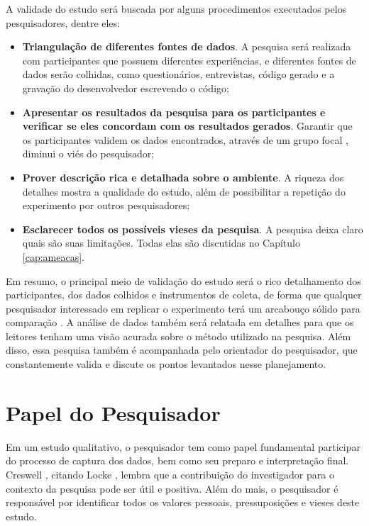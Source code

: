 A validade do estudo será buscada por alguns procedimentos executados pelos
pesquisadores, dentre eles:

\begin{itemize}
	\item \textbf{Triangulação de diferentes fontes de dados}. A pesquisa será
	realizada com participantes que possuem diferentes experiências, e diferentes
	fontes de dados serão colhidas, como questionários, entrevistas, código gerado e 
	a gravação do desenvolvedor escrevendo o código;

	\item \textbf{Apresentar os resultados da pesquisa para os participantes e
	verificar se eles concordam com os resultados gerados}. Garantir que os
	participantes validem os dados encontrados, através de um grupo focal \cite{creswell},
	diminui o viés do pesquisador;

	\item \textbf{Prover descrição rica e detalhada sobre o ambiente}. A riqueza
	dos detalhes mostra a qualidade do estudo, além de possibilitar a repetição do
	experimento por outros pesquisadores;

	\item \textbf{Esclarecer todos os possíveis vieses da pesquisa}. A pesquisa
	deixa claro quais são suas limitações. Todas elas são discutidas no Capítulo
	\ref{cap:ameacas}.

\end{itemize}

Em resumo, o principal meio de validação do estudo será o rico detalhamento dos
participantes, dos dados colhidos e instrumentos de coleta, de forma
que qualquer pesquisador interessado em replicar o experimento terá um
arcabouço sólido para comparação \cite{merriam-1998}. A análise de
dados também será relatada em detalhes para que os leitores tenham uma visão
acurada sobre o método utilizado na pesquisa. 
Além disso, essa pesquisa também é acompanhada pelo orientador do pesquisador,
que constantemente valida e discute os pontos levantados nesse planejamento.

\section{Papel do Pesquisador}
\label{sec:planejamento-papel}

Em um estudo qualitativo, o pesquisador tem como papel fundamental participar do 
processo de captura dos dados, bem como seu preparo e interpretação final.
Creswell \cite{creswell}, citando Locke \cite{locke}, lembra
que a contribuição do investigador para o contexto da pesquisa pode ser útil e
positiva. Além do mais, o pesquisador é responsável por
identificar todos os valores pessoais, pressuposições e vieses deste estudo.

